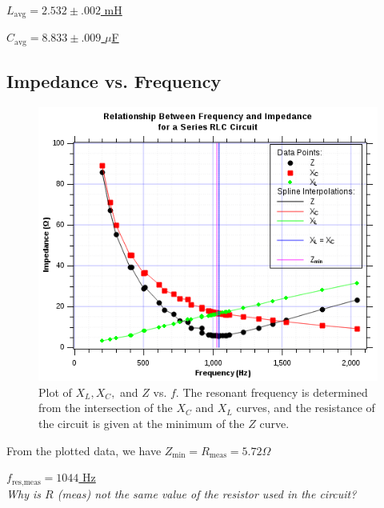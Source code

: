 \documentclass[twocolumn,english]{IEEEtran}
\theoremstyle{plain}
\theoremstyle{plain}
\begin{document}
\underline{$L_{\text{avg}} = 2.532\pm .002$ mH}

\underline{$C_{\text{avg}} = 8.833 \pm .009$ $\mu$F}

\hrulefill

\subsection{Impedance vs. Frequency}


\begin{figure}[H]
	\begin{centering}
	\begin{center}
	\includegraphics[width=\linewidth]{./Part2.png}
	\caption{Plot of $X_L, X_C, $ and $Z$ vs. $f$. The resonant frequency is determined from the intersection of the $X_C$ and $X_L$ curves, and the resistance of the circuit is given at the minimum of the $Z$ curve.}
	\label{fig:xf_graph1}
	\end{center}
	\par\end{centering}
\end{figure}

From the plotted data, we have
\hfill\underline{$Z_{\text{min}} = R_{\text{meas}} = 5.72 \Omega$}

\hfill\underline{$f_{\text{res,meas}} = 1044$ Hz} \\

\textit{Why is $R$ (meas) not the same value of the resistor used in the circuit?}
\end{document}
